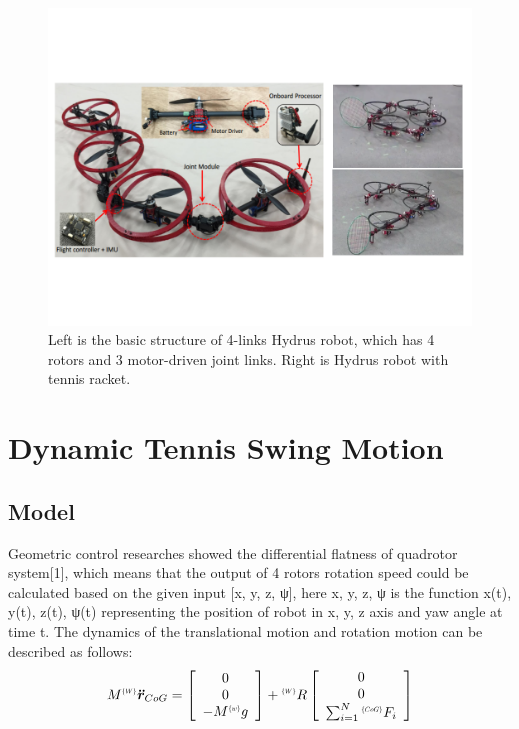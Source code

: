 \documentclass{jarticle}
\begin{document}
\begin{figure}[htb]
  \centering
  \includegraphics[clip, bb= 10 128 777 457,  width=\columnwidth]{figs_orig/figure.pdf}
  \caption{Left is the basic structure of 4-links Hydrus robot, which has 4 rotors and 3 motor-driven joint links. Right is Hydrus robot with tennis racket.}
  \label{fig:abst-image}
\end{figure}

\section{Dynamic Tennis Swing Motion}

\subsection{Model}
Geometric control researches showed the differential flatness of quadrotor  system[1], which means that the output of 4 rotors rotation speed could be calculated based on the given input [x, y, z, ψ], here x, y, z, ψ is the function x(t), y(t), z(t), ψ(t)  representing the position of robot in x, y, z axis and yaw angle at time t.
The dynamics of the translational motion and rotation motion can be described as follows:
\begin{equation}
  \label{eq:model1}
  M^{\scalebox{.5}{$\{W\}$}}\bm{\ddot{r}}_{CoG} =\left[ \begin{array}{c}
      0 \\
      0 \\
      -M^{\scalebox{.5}{$\{w\}$}}g
    \end{array}\right]
  + {}^{\scalebox{.5}{$\{W\}$}}R \left[ \begin{array}{c}
        0 \\
        0 \\
        \sum_{i=1}^{N} {}^{\scalebox{.5}{$\{CoG\}$}}F_i
      \end{array}\right]
\end{equation}
\end{document}
